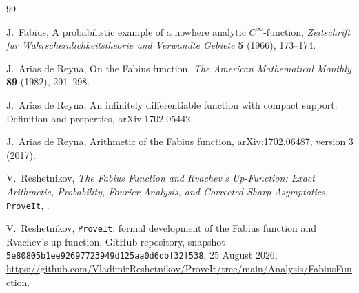 \documentclass[11pt,oneside]{article}
\theoremstyle{definition}
\theoremstyle{remark}
\begin{document}
\nocite{integration:fabius1966,integration:arias1982,integration:arias05442,integration:arias2018,integration:mainarticle,integration:repo}
\renewcommand{\refname}{Dossier references}
\begin{thebibliography}{99}

J.~Fabius,
\newblock A probabilistic example of a nowhere analytic $C^\infty$-function,
\newblock \emph{Zeitschrift f\"ur Wahrscheinlichkeitstheorie und Verwandte Gebiete}
\textbf{5} (1966), 173--174.

J.~Arias de Reyna,
\newblock On the Fabius function,
\newblock \emph{The American Mathematical Monthly} \textbf{89} (1982), 291--298.

J.~Arias de Reyna,
\newblock An infinitely differentiable function with compact support: Definition and properties,
\newblock arXiv:1702.05442.

J.~Arias de Reyna,
\newblock Arithmetic of the Fabius function,
\newblock arXiv:1702.06487, version 3 (2017).

V.~Reshetnikov,
\newblock \emph{The Fabius Function and Rvachev's Up-Function: Exact Arithmetic,
Probability, Fourier Analysis, and Corrected Sharp Asymptotics},
\newblock \texttt{ProveIt},
.

V.~Reshetnikov,
\newblock \texttt{ProveIt}: formal development of the Fabius function and Rvachev's
up-function,
\newblock GitHub repository, snapshot
\texttt{5e80805b1ee92697723949d125aa0d6dbf32f538}, 25 August 2026,
\newblock \url{https://github.com/VladimirReshetnikov/ProveIt/tree/main/Analysis/FabiusFunction}.

\end{thebibliography}


\renewcommand{\arraystretch}{1}


\clearpage
\end{document}
